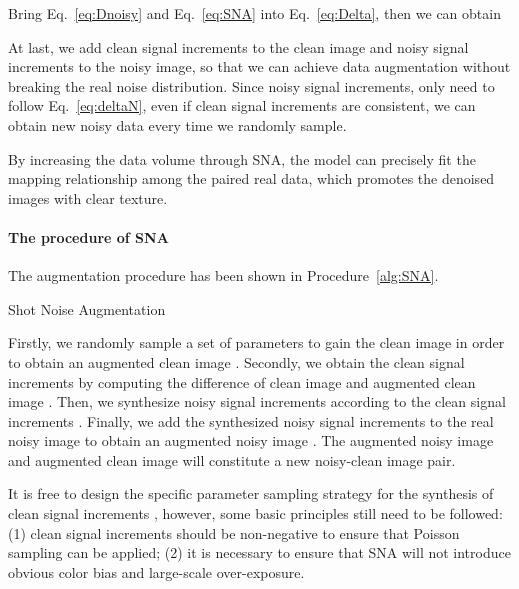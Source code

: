 \documentclass[sigconf,screen,nonacm]{acmart}
\begin{document}
    Bring Eq.~\eqref{eq:Dnoisy} and Eq.~\eqref{eq:SNA} into Eq.~\eqref{eq:Delta}, then we can obtain
    

    At last, we add clean signal increments  to the clean image and noisy signal increments  to the noisy image, so that we can achieve data augmentation without breaking the real noise distribution. Since noisy signal increments,  only need to follow Eq.~\eqref{eq:deltaN}, even if clean signal increments  are consistent, we can obtain new noisy data every time we randomly sample.

    By increasing the data volume through SNA, the model can precisely fit the mapping relationship among the paired real data, which promotes the denoised images with clear texture.

    \paragraph{\textbf{The procedure of SNA}}
    The augmentation procedure has been shown in Procedure~\ref{alg:SNA}.
    \begin{algorithm}[t!]{}
    	\caption{Shot Noise Augmentation}
    	\label{alg:SNA}
\begin{algorithmic}
    		\Require 
    		\Ensure 
    		\State 
    		\State 
    		\State 
    		\State 
    		\State 
    		\State \Return{}
    		\EndFunction
    		\State  {}
    		\State  
    		\State 
    		\State 
    		\State 
    	\end{algorithmic}
    \end{algorithm}
    
    Firstly, we randomly sample a set of parameters to gain the clean image  in order to obtain an augmented clean image . Secondly, we obtain the clean signal increments  by computing the difference of clean image  and augmented clean image . Then, we synthesize noisy signal increments  according to the clean signal increments . Finally, we add the synthesized noisy signal increments  to the real noisy image  to obtain an augmented noisy image . The augmented noisy image  and augmented clean image  will constitute a new noisy-clean image pair.

    It is free to design the specific parameter sampling strategy for the synthesis of clean signal increments , however, some basic principles still need to be followed:
    (1) clean signal increments  should be non-negative to ensure that Poisson sampling can be applied;
(2) it is necessary to ensure that SNA will not introduce obvious color bias and large-scale over-exposure.
    
\end{document}
